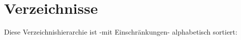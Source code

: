\section{Verzeichnisse}
Diese Verzeichnishierarchie ist -\/mit Einschränkungen-\/ alphabetisch sortiert:\begin{DoxyCompactList}
\item {}
\item {}
\end{DoxyCompactList}
